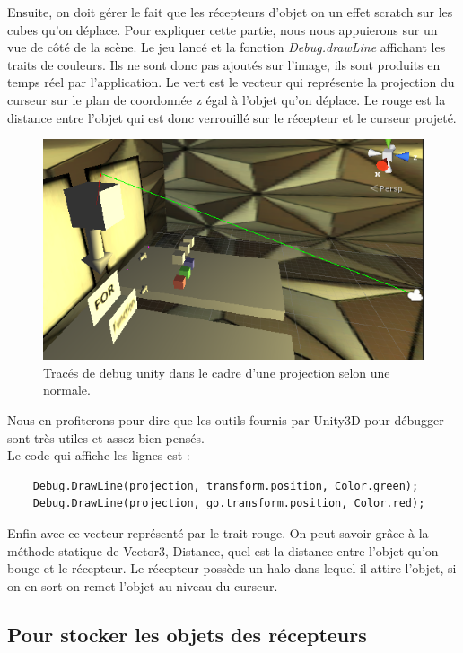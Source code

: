 \documentclass[a4paper,11pt]{myreport}
\begin{document}
	\par Ensuite, on doit gérer le fait que les récepteurs d'objet on un effet scratch sur les cubes qu'on déplace. Pour expliquer cette partie, nous nous appuierons sur un vue de côté de la scène. Le jeu lancé et la fonction \textit{Debug.drawLine} affichant les traits de couleurs. Ils ne sont donc pas ajoutés sur l'image, ils sont produits en temps réel par l'application. Le vert est le vecteur qui représente la projection du curseur sur le plan de coordonnée z égal à l'objet qu'on déplace. Le rouge est la distance entre l'objet qui est donc verrouillé sur le récepteur et le curseur projeté.
	
	\begin{figure}[h]
	\includegraphics[scale=0.90]{./images/projection.png}
	\caption{Tracés de debug unity dans le cadre d'une projection selon une normale.}
	\end{figure}
	Nous en profiterons pour dire que les outils fournis par Unity3D pour débugger sont très utiles et assez bien pensés. \\Le code qui affiche les lignes est :
\lstset{style=sharpc}
	\begin{lstlisting}
	Debug.DrawLine(projection, transform.position, Color.green);
	Debug.DrawLine(projection, go.transform.position, Color.red);
	\end{lstlisting}
	\par Enfin avec ce vecteur représenté par le trait rouge. On peut savoir grâce à la méthode statique de Vector3, Distance, quel est la distance entre l'objet qu'on bouge et le récepteur. Le récepteur possède un halo dans lequel il attire l'objet, si on en sort on remet l'objet au niveau du curseur.
	\subsection{Pour stocker les objets des récepteurs}
	
\end{document}
